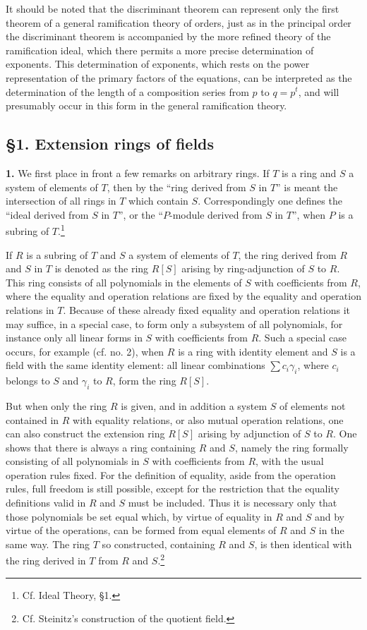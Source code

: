 \documentclass[11pt]{article}
\begin{document}
It should be noted that the discriminant theorem can represent only the first theorem of a general ramification theory of orders, just as in the principal order the discriminant theorem is accompanied by the more refined theory of the ramification ideal, which there permits a more precise determination of exponents. This determination of exponents, which rests on the power representation of the primary factors of the equations, can be interpreted as the determination of the length of a composition series from $p$ to $q=p^t$, and will presumably occur in this form in the general ramification theory.

\subsection*{\S 1. Extension rings of fields}

\textbf{1.} We first place in front a few remarks on arbitrary rings. If $T$ is a ring and $S$ a system of elements of $T$, then by the ``ring derived from $S$ in $T$'' is meant the intersection of all rings in $T$ which contain $S$. Correspondingly one defines the ``ideal derived from $S$ in $T$'', or the ``$P$-module derived from $S$ in $T$'', when $P$ is a subring of $T$.\footnote{Cf. Ideal Theory, \S 1.}

If $R$ is a subring of $T$ and $S$ a system of elements of $T$, the ring derived from $R$ and $S$ in $T$ is denoted as the ring $R[S]$ arising by ring-adjunction of $S$ to $R$. This ring consists of all polynomials in the elements of $S$ with coefficients from $R$, where the equality and operation relations are fixed by the equality and operation relations in $T$. Because of these already fixed equality and operation relations it may suffice, in a special case, to form only a subsystem of all polynomials, for instance only all linear forms in $S$ with coefficients from $R$. Such a special case occurs, for example (cf. no. 2), when $R$ is a ring with identity element and $S$ is a field with the same identity element: all linear combinations $\sum c_i\gamma_i$, where $c_i$ belongs to $S$ and $\gamma_i$ to $R$, form the ring $R[S]$.

But when only the ring $R$ is given, and in addition a system $S$ of elements not contained in $R$ with equality relations, or also mutual operation relations, one can also construct the extension ring $R[S]$ arising by adjunction of $S$ to $R$. One shows that there is always a ring containing $R$ and $S$, namely the ring formally consisting of all polynomials in $S$ with coefficients from $R$, with the usual operation rules fixed. For the definition of equality, aside from the operation rules, full freedom is still possible, except for the restriction that the equality definitions valid in $R$ and $S$ must be included. Thus it is necessary only that those polynomials be set equal which, by virtue of equality in $R$ and $S$ and by virtue of the operations, can be formed from equal elements of $R$ and $S$ in the same way. The ring $T$ so constructed, containing $R$ and $S$, is then identical with the ring derived in $T$ from $R$ and $S$.\footnote{Cf. Steinitz's construction of the quotient field.}
\end{document}
